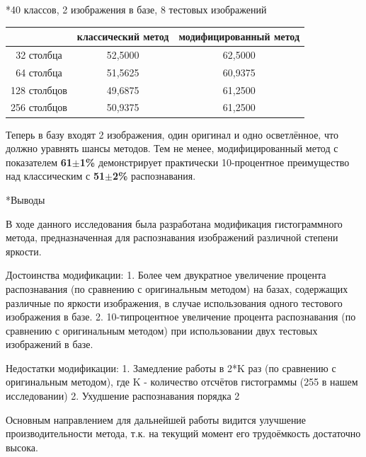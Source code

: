 \documentclass[a4paper,12pt,titlpage]{posobie}
\makeatletter
\renewcommand{\section}{\@startsection{section}{1}{0.0cm}{0.5cm}{0.1cm}%
             {\fontsize{16}{16}\bf\selectfont }}
\renewcommand{\subsubsection}{\@startsection{subsubsection}{3}{0.0cm}{0.2cm}{0.1cm}%
    {\fontsize{16}{16}\it\selectfont }}
\makeatother
\begin{document}
\subsubsection*{40 классов, 2 изображения в базе, 8 тестовых изображений}

\begin{tabular}{|c|c|c|} \hline
&классический метод&модифицированный метод\\ \hline
32 столбца&52,5000&62,5000\\ \hline
64 столбца&51,5625&60,9375\\ \hline
128 столбцов&49,6875&61,2500\\ \hline
256 столбцов&50,9375&61,2500\\ \hline
\end{tabular}

Теперь в базу входят 2 изображения, один оригинал и одно осветлённое, что должно уравнять шансы методов. 
Тем не менее, модифицированный метод с показателем \textbf{61}$\pm$\textbf{1\%} демонстрирует практически 
10-процентное преимущество над классическим с \textbf{51}$\pm$\textbf{2\%} распознавания.

\section*{Выводы}

В ходе данного исследования была разработана модификация гистограммного метода, предназначенная для распознавания изображений различной степени яркости.

Достоинства модификации:
1. Более чем двукратное увеличение процента распознавания (по сравнению с оригинальным методом) на базах, содержащих различные по яркости изображения, в случае использования одного тестового изображения в базе.
2. 10-типроцентное увеличение процента распознавания (по сравнению с оригинальным методом) при использовании двух тестовых изображений в базе.

Недостатки модификации:
1. Замедление работы в 2*K раз (по сравнению с оригинальным методом), где K - количество отсчётов гистограммы (255 в нашем исследовании)
2. Ухудшение распознавания порядка 2%

Основным направлением для дальнейшей работы видится улучшение производительности метода, т.к. на текущий момент его трудоёмкость достаточно высока.
\end{document}
